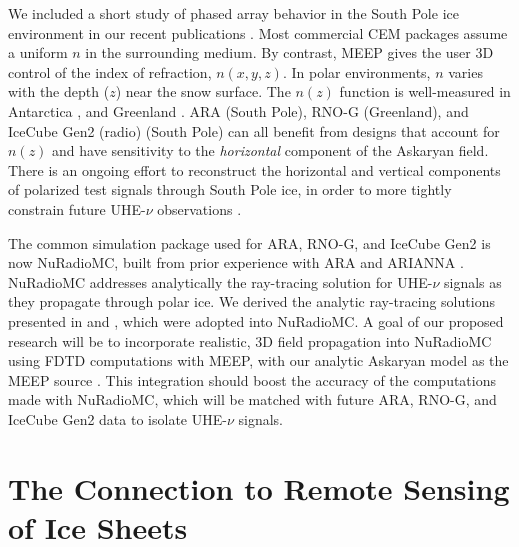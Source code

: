 \documentclass[../../main.tex]{subfiles}
\begin{document}
We included a short study of phased array behavior in the South Pole ice environment in our recent publications \cite{electronics10040415,10.1016/j.cpc.2009.11.008}.  Most commercial CEM packages assume a uniform $n$ in the surrounding medium.  By contrast, MEEP gives the user 3D control of the index of refraction, $n(x,y,z)$.  In polar environments, $n$ varies with the depth ($z$) near the snow surface.  The $n(z)$ function is well-measured in Antarctica \cite{horizPaper}, and Greenland \cite{deaconu_2018}.  ARA (South Pole), RNO-G (Greenland), and IceCube Gen2 (radio) (South Pole) can all benefit from designs that account for $n(z)$ and have sensitivity to the \textit{horizontal} component of the Askaryan field. There is an ongoing effort to reconstruct the horizontal and vertical components of polarized test signals through South Pole ice, in order to more tightly constrain future UHE-$\nu$ observations \cite{10.1088/1748-0221/15/09/p09039}. \\ \vspace{2.5mm}

The common simulation package used for ARA, RNO-G, and IceCube Gen2 is now NuRadioMC, built from prior experience with ARA and ARIANNA \cite{10.1140/epjc/s10052-020-7612-8,10.1109/tns.2015.2468182,10.1016/j.astropartphys.2011.11.010,Barwick:2014pca,10.1103/physrevd.102.043021}.  NuRadioMC addresses analytically the ray-tracing solution for UHE-$\nu$ signals as they propagate through polar ice.  We derived the analytic ray-tracing solutions presented in \cite{10.1140/epjc/s10052-020-7612-8} and \cite{horizPaper}, which were adopted into NuRadioMC.  A goal of our proposed research will be to incorporate realistic, 3D field propagation into NuRadioMC using FDTD computations with MEEP, with our analytic Askaryan model as the MEEP source \cite{PhysRevD.105.123019,10.22323/1.395.1217}.  This integration should boost the accuracy of the computations made with NuRadioMC, which will be matched with future ARA, RNO-G, and IceCube Gen2 data to isolate UHE-$\nu$ signals.

\section{The Connection to Remote Sensing of Ice Sheets}
\label{sec:cresis}
\end{document}
